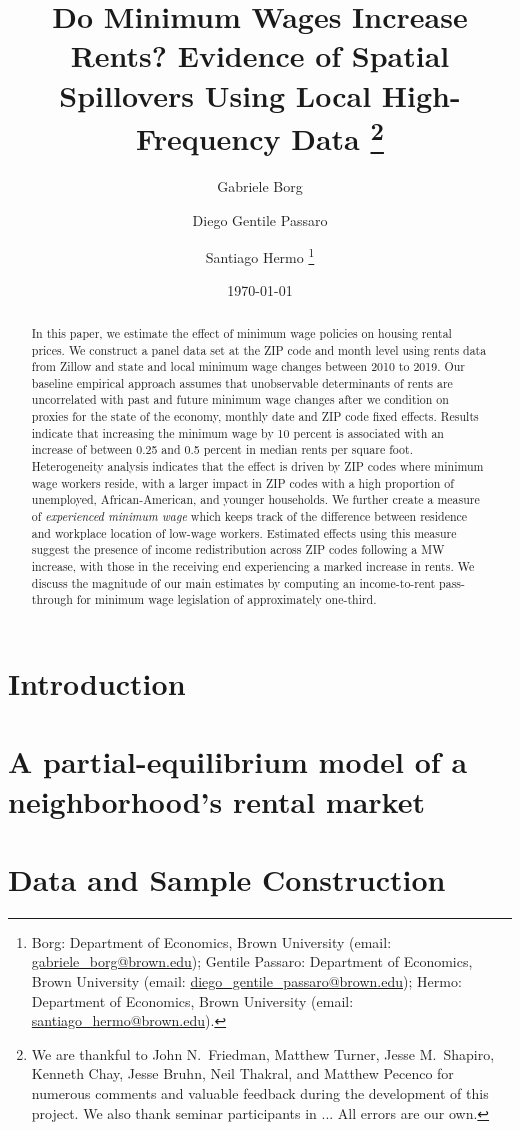 \documentclass{article}
\title{ Do Minimum Wages Increase Rents? 
        Evidence of Spatial Spillovers Using Local High-Frequency Data
        \thanks{We are thankful to John N.\ Friedman, Matthew Turner, Jesse M.\ Shapiro, 
        Kenneth Chay, Jesse Bruhn, Neil Thakral, and Matthew Pecenco for numerous 
        comments and valuable feedback during the development of this project.
        We also thank seminar participants in ... %
        All errors are our own.}}
\author{Gabriele Borg \and Diego Gentile Passaro \and Santiago Hermo
        \footnote{
        Borg: Department of Economics, Brown University 
        (email: \url{gabriele_borg@brown.edu}); 
        Gentile Passaro: Department of Economics, Brown University 
        (email: \url{diego_gentile_passaro@brown.edu}); 
        Hermo: Department of Economics, Brown University 
        (email: \url{santiago_hermo@brown.edu}).}}
\date{\today}
\begin{document}
\maketitle

\begin{abstract}
    \noindent
    In this paper, we estimate the effect of minimum wage policies on housing rental 
    prices. We construct a panel data set at the ZIP code and month level using rents 
    data from Zillow and state and local minimum wage changes between 2010 to 2019. 
    Our baseline empirical approach assumes that unobservable determinants of rents 
    are uncorrelated with past and future minimum wage changes after we condition on 
    proxies for the state of the economy, monthly date and ZIP code fixed effects. 
    Results indicate that increasing the minimum wage by 10 percent is associated with 
    an increase of between 0.25 and 0.5 percent in median rents per square foot. 
    Heterogeneity analysis indicates that the effect is driven by ZIP codes where minimum 
    wage workers reside, with a larger impact in ZIP codes with a high proportion of 
    unemployed, African-American, and younger households. 
    We further create a measure of \textit{experienced minimum wage} which keeps track 
    of the difference between residence and workplace location of low-wage workers. 
    Estimated effects using this measure suggest the presence of income redistribution 
    across ZIP codes following a MW increase, with those in the receiving end 
    experiencing a marked increase in rents. 
    We discuss the magnitude of our main estimates by computing an income-to-rent 
    pass-through for minimum wage legislation of approximately one-third.
\end{abstract}

\vspace{5mm}


\clearpage

\section{Introduction}\label{sec:intro}
    

\section{A partial-equilibrium model of a neighborhood's rental market}\label{sec:data}
	

\section{Data and Sample Construction}\label{sec:data}
	
\end{document}
